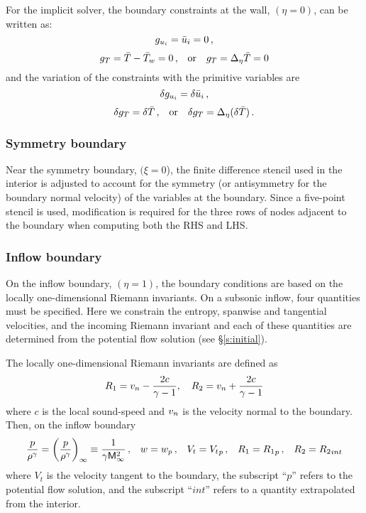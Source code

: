 For the implicit solver, the boundary constraints at the wall, $(\eta=0)$, can
be written as:
%
\begin{equation}
  g_{u_i} = \bar u_{i} = 0 {\, ,}
\end{equation}
%
\begin{equation}
  g_T = \bar T - \bar T_w = 0 {\, ,} \quad \mbox{or} \quad g_T = \Delta_\eta \bar T = 0
\end{equation}
%
and the variation of the constraints with the primitive variables are
%
\begin{equation}
  \delta g_{u_i} = \delta \bar u_i {\, ,}
\end{equation}
%
\begin{equation}
  \delta g_T = \delta \bar T {\, ,} \quad \mbox{or} \quad 
               \delta g_T = \Delta_\eta (\delta \bar T) {\, .}
\end{equation}

\subsubsection{Symmetry boundary}

Near the symmetry boundary, $(\xi=0$), the finite difference stencil used in
the interior is adjusted to account for the symmetry (or antisymmetry for the
boundary normal velocity) of the variables at the boundary.  Since a
five-point stencil is used, modification is required for the three rows of
nodes adjacent to the boundary when computing both the RHS and LHS.

\subsubsection{Inflow boundary \label{s:inflow} }

On the inflow boundary, $(\eta=1)$, the boundary conditions are based on the
locally one-dimen\-sional Riemann invariants.  On a subsonic inflow, four
quantities must be specified.  Here we constrain the entropy, spanwise and
tangential velocities, and the incoming Riemann invariant and each of these
quantities are determined from the potential flow solution (see
\S\ref{s:initial}).

The locally one-dimensional Riemann invariants are defined as
%
\begin{equation}
  R_1 = {v_n} - \frac{2 c}{\gamma - 1} , \quad R_2 = {v_n} + \frac{2 c}{\gamma-1}
\end{equation}
%
where $c$ is the local sound-speed and ${v_n}$ is the velocity normal to the
boundary.  Then, on the inflow boundary
%
\begin{equation} \label{e:Riemann}
  \frac{p}{\rho^\gamma} = \left(\frac{p}{\rho^\gamma}\right)_\infty \equiv 
                          \frac{1}{\gamma{\sf M}_\infty^2} {\, ,} \quad
  w = w_p {\, ,} \quad
  V_t = {V_t}_p {\, ,} \quad
  R_1 = {R_1}_p {\, ,} \quad
  R_2 = {R_2}_{int}
\end{equation}
%
where $V_t$ is the velocity tangent to the boundary, the subscript ``$p$''
refers to the potential flow solution, and the subscript ``$int$'' refers to a
quantity extrapolated from the interior.

